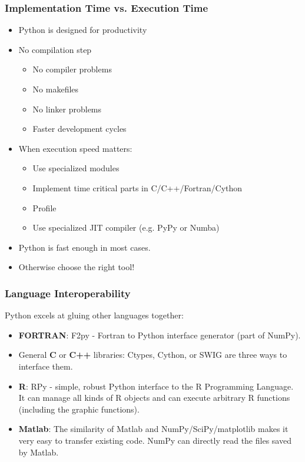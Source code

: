 \documentclass[handout]{beamer}
\begin{document}
\begin{frame}
    \frametitle{Implementation Time vs. Execution Time}
     \begin{itemize}
    	\item Python is designed for productivity
    	\pause
    	\item No compilation step
       \begin{itemize}
	    \item No compiler problems
	    \item No makefiles
	    \item No linker problems
	    \item Faster development cycles
        \end{itemize}
    	\pause
    	\item When execution speed matters:
        \begin{itemize}
    	    \item Use specialized modules
    	    \item Implement time critical parts in C/C++/Fortran/Cython
      	    \item Profile
      	    \item Use specialized JIT compiler (e.g. PyPy or Numba)
        \end{itemize}
        \item Python is fast enough in most cases.
        \item Otherwise choose the right tool!
    \end{itemize}
\end{frame}

\begin{frame}
    \frametitle{Language Interoperability}
    Python excels at gluing other languages together:
     \begin{itemize}
       \item \textbf{FORTRAN}: F2py - Fortran to Python interface generator (part of NumPy).
       \pause
       \item General \textbf{C} or \textbf{C++} libraries: Ctypes, Cython, or SWIG are three ways to interface them.
       \pause
       \item \textbf{R}: RPy - simple, robust Python interface to the R Programming Language. It can manage all kinds of R objects and can execute arbitrary R functions (including the graphic functions).
    \end{itemize}
     \begin{itemize}
       \item \textbf{Matlab}: The similarity of Matlab and NumPy/SciPy/matplotlib makes it very easy to transfer existing code. NumPy can directly read the files saved by Matlab.
    \end{itemize}
\end{frame}
\end{document}
